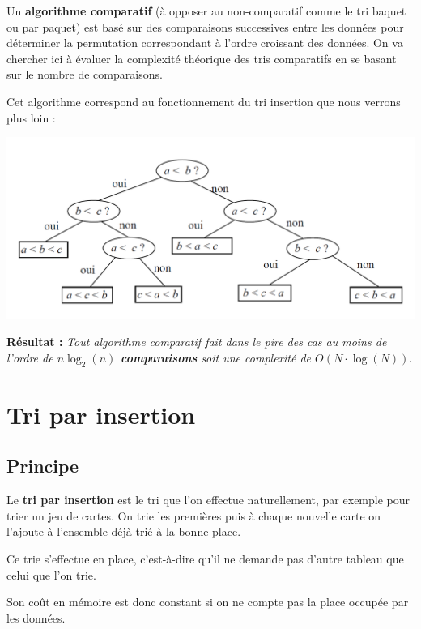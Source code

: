 \begin{exemple2}

Un \textbf{algorithme comparatif} (à opposer au non-comparatif comme le tri baquet ou par paquet) est basé sur des comparaisons successives entre les données pour déterminer la permutation correspondant à l'ordre croissant des données.
On va chercher ici à évaluer la complexité théorique des tris comparatifs en se basant sur le nombre de comparaisons.

Cet algorithme correspond au fonctionnement du tri insertion que nous verrons plus loin :

\begin{center}
\includegraphics[width=.8\textwidth]{images/C2.png}
\end{center}

\textbf{Résultat :}\textit{ Tout algorithme comparatif fait dans le pire des cas au moins de l'ordre de
\textbf{$n \log_2(n)$ comparaisons} soit une complexité de \textbf{$O(N\cdot \log(N))$}}.
\end{exemple2}

\section{Tri par insertion}
\subsection{Principe}

\begin{definition2}
Le \textbf{tri par insertion} est le tri que l'on effectue naturellement, par exemple pour trier un jeu de cartes. On trie les premières puis à chaque nouvelle carte on l'ajoute à l'ensemble déjà trié à la bonne place. 

Ce trie s'effectue en place, c'est-à-dire qu'il ne demande pas d'autre tableau que celui que l'on trie. 

Son coût en mémoire est donc constant si on ne compte pas la place occupée par les données.
\end{definition2}

